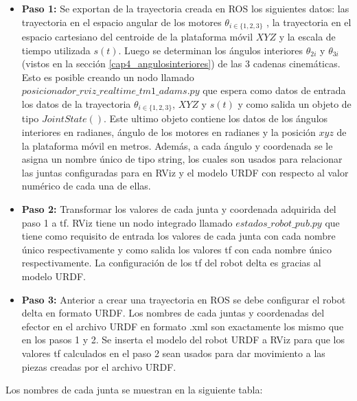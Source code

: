         \begin{itemize}
            \item {\textbf{Paso 1:} Se exportan de la trayectoria creada en ROS los siguientes datos: las trayectoria en el espacio angular de los motores $\theta_{i\in\{1,2,3\}}$ , la trayectoria en el espacio cartesiano del centroide de la plataforma móvil $XYZ$ y la escala de tiempo utilizada $s(t)$. Luego se determinan los ángulos interiores $\theta_{2i}$ y $\theta_{3i}$ (vistos en la sección \eqref{cap4_angulosinteriores}) de las 3 cadenas cinemáticas. Esto es posible creando un nodo llamado $posicionador\_rviz\_realtime\_tm1\_adams.py$ que espera como datos de entrada los datos de la trayectoria  $\theta_{i\in\{1,2,3\}}$, $XYZ$ y $s(t)$ y como salida un objeto de tipo $JointState()$. Este ultimo objeto contiene los datos de los ángulos interiores en radianes, ángulo de los motores en radianes y la posición $xyz$ de la plataforma móvil en metros. Además, a cada ángulo y coordenada se le asigna un nombre único de tipo string, los cuales son usados para relacionar las juntas configuradas para en RViz y el modelo URDF con respecto al valor numérico de cada una de ellas.}
            \item {\textbf{Paso 2:} Transformar los valores de cada junta y coordenada adquirida del paso 1 a tf. RViz tiene un nodo integrado llamado $estados\_robot\_pub.py$ que tiene como requisito de entrada los valores de cada junta con cada nombre único respectivamente y como salida los valores tf con cada nombre único respectivamente. La configuración de los tf del robot delta es gracias al modelo URDF.}
            \item {\textbf{Paso 3:} Anterior a crear una trayectoria en ROS se debe configurar el robot delta en formato URDF. Los nombres de cada juntas y coordenadas del efector en el archivo URDF en formato .xml son exactamente los mismo que en los pasos 1 y 2. Se inserta el modelo del robot URDF a RViz para que los valores tf calculados en el paso 2 sean usados para dar movimiento a las piezas creadas por el archivo URDF.}
        \end{itemize}
        
            Los nombres de cada junta se muestran en la siguiente tabla: 
            
